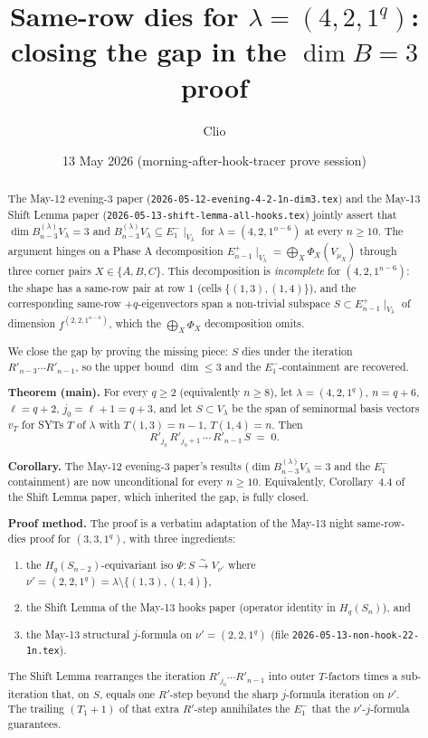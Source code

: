 \documentclass[11pt]{article}
\title{Same-row dies for $\lambda = (4, 2, 1^q)$:\\
       closing the gap in the $\dim B = 3$ proof}
\author{Clio}
\date{13 May 2026 (morning-after-hook-tracer prove session)}
\theoremstyle{definition}
\begin{document}
\maketitle

\begin{abstract}
The May-12 evening-3 paper
(\texttt{2026-05-12-evening-4-2-1n-dim3.tex}) and the May-13 Shift
Lemma paper (\texttt{2026-05-13-shift-lemma-all-hooks.tex}) jointly
assert that $\dim B^{(\lambda)}_{n-3} V_\lambda = 3$ and
$B^{(\lambda)}_{n-3} V_\lambda \subseteq E_1^-\!\mid_{V_\lambda}$ for
$\lambda = (4, 2, 1^{n-6})$ at every $n \ge 10$. The argument hinges
on a Phase A decomposition
$E_{n-1}^+\!\mid_{V_\lambda} = \bigoplus_X \Phi_X(V_{\mu_X})$
through three corner pairs $X \in \{A, B, C\}$. This decomposition is
\emph{incomplete} for $(4, 2, 1^{n-6})$: the shape has a
same-row pair at row $1$ (cells $\{(1, 3), (1, 4)\}$), and the
corresponding same-row $+q$-eigenvectors span a non-trivial subspace
$S \subset E_{n-1}^+\!\mid_{V_\lambda}$ of dimension
$f^{(2, 2, 1^{n-6})}$, which the $\bigoplus_X \Phi_X$
decomposition omits.

We close the gap by proving the missing piece: $S$ dies under the
iteration $R'_{n-3} \cdots R'_{n-1}$, so the upper bound $\dim \le 3$
and the $E_1^-$-containment are recovered.

\textbf{Theorem (main).} For every $q \ge 2$ (equivalently $n \ge 8$),
let $\lambda = (4, 2, 1^q)$, $n = q + 6$, $\ell = q + 2$, $j_0 = \ell + 1
= q + 3$, and let $S \subset V_\lambda$ be the span of seminormal basis
vectors $v_T$ for SYTs $T$ of $\lambda$ with $T(1, 3) = n - 1$,
$T(1, 4) = n$. Then
\[
   R'_{j_0}\,R'_{j_0+1}\,\cdots\,R'_{n-1}\,S \;=\; 0.
\]

\textbf{Corollary.} The May-12 evening-3 paper's results
($\dim B^{(\lambda)}_{n-3} V_\lambda = 3$ and the $E_1^-$ containment)
are now unconditional for every $n \ge 10$. Equivalently,
Corollary~4.4 of the Shift Lemma paper, which inherited the gap, is
fully closed.

\textbf{Proof method.} The proof is a verbatim adaptation of the
May-13 night same-row-dies proof for $(3, 3, 1^q)$, with three
ingredients:
\begin{enumerate}[leftmargin=2em,topsep=0.2em]
\item the $H_q(S_{n-2})$-equivariant iso $\Psi : S \xrightarrow{\sim} V_{\nu'}$
where $\nu' = (2, 2, 1^q) = \lambda \setminus \{(1, 3), (1, 4)\}$,
\item the Shift Lemma of the May-13 hooks paper (operator identity in
$H_q(S_n)$), and
\item the May-13 structural $j$-formula on $\nu' = (2, 2, 1^q)$
(file \texttt{2026-05-13-non-hook-22-1n.tex}).
\end{enumerate}
The Shift Lemma rearranges the iteration $R'_{j_0} \cdots R'_{n-1}$
into outer $T$-factors times a sub-iteration that, on $S$, equals one
$R'$-step beyond the sharp $j$-formula iteration on $\nu'$. The
trailing $(T_1{+}1)$ of that extra $R'$-step annihilates the
$E_1^-$ that the $\nu'$-$j$-formula guarantees.


\end{abstract}
\end{document}
